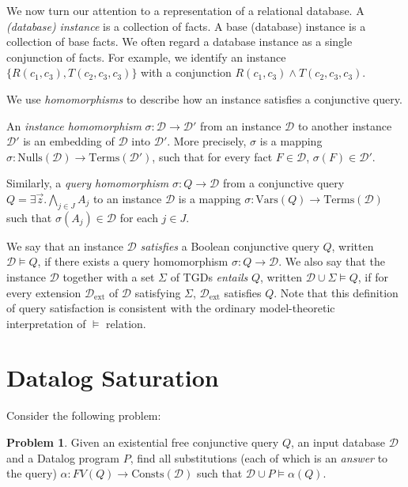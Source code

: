 \documentclass[12pt]{report}
\theoremstyle{plain}
\theoremstyle{definition}
\newtheorem{problem}[theorem]{Problem}
\def\Vars{{\mathrm{Vars}}}
\def\Consts{{\mathrm{Consts}}}
\def\Terms{{\mathrm{Terms}}}
\def\Nulls{{\mathrm{Nulls}}}
\begin{document}
We now turn our attention to a representation of a relational database. A \emph{(database) instance} is a collection of facts. A base (database) instance is a collection of base facts. We often regard a database instance as a single conjunction of facts. For example, we identify an instance $\{ R(c_1, c_3), T(c_2, c_3, c_3) \}$ with a conjunction $R(c_1, c_3) \wedge T(c_2, c_3, c_3)$.

We use \emph{homomorphisms} to describe how an instance satisfies a conjunctive query.

An \emph{instance homomorphism} $\sigma: \mathcal{D} \rightarrow \mathcal{D}'$ from an instance $\mathcal{D}$ to another instance $\mathcal{D}'$ is an embedding of $\mathcal{D}$ into $\mathcal{D}'$. More precisely, $\sigma$ is a mapping $\sigma: \Nulls(\mathcal{D}) \rightarrow \Terms(\mathcal{D}')$, such that for every fact $F \in \mathcal{D}$, $\sigma(F) \in \mathcal{D}'$.

Similarly, a \emph{query homomorphism} $\sigma: Q \rightarrow \mathcal{D}$ from a conjunctive query $Q = \exists \vec{z}. \bigwedge_{j \in J} A_j$ to an instance $\mathcal{D}$ is a mapping $\sigma: \Vars(Q) \rightarrow \Terms(\mathcal{D})$ such that $\sigma(A_j) \in \mathcal{D}$ for each $j \in J$.

We say that an instance $\mathcal{D}$ \emph{satisfies} a Boolean conjunctive query $Q$, written $\mathcal{D} \models Q$, if there exists a query homomorphism $\sigma: Q \rightarrow \mathcal{D}$. We also say that the instance $\mathcal{D}$ together with a set $\Sigma$ of TGDs \emph{entails} $Q$, written $\mathcal{D} \cup \Sigma \models Q$, if for every extension $\mathcal{D}_\mathrm{ext}$ of $\mathcal{D}$ satisfying $\Sigma$, $\mathcal{D}_\mathrm{ext}$ satisfies $Q$. Note that this definition of query satisfaction is consistent with the ordinary model-theoretic interpretation of $\models$ relation.

\section{Datalog Saturation}

Consider the following problem:

\begin{problem}
   Given an existential free conjunctive query $Q$, an input database $\mathcal{D}$ and a Datalog program $P$, find all substitutions (each of which is an \emph{answer} to the query) $\alpha: FV(Q) \rightarrow \Consts(\mathcal{D})$ such that $\mathcal{D} \cup P \models \alpha(Q)$.
\end{problem}
\end{document}
